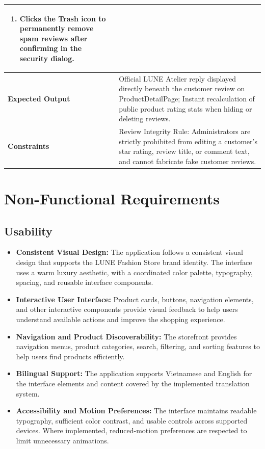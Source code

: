 \documentclass[12pt,a4paper,oneside]{report}
\begin{document}
\begin{longtable}{|p{3.6cm}|p{11.9cm}|}
\begin{enumerate}[leftmargin=*,nosep,topsep=2pt]
  \item Clicks the Trash icon to permanently remove spam reviews after confirming in the security dialog.
\end{enumerate} \\
\hline
\textbf{Expected Output} & Official LUNE Atelier reply displayed directly beneath the customer review on ProductDetailPage; Instant recalculation of public product rating stats when hiding or deleting reviews. \\
\hline
\textbf{Constraints} & Review Integrity Rule: Administrators are strictly prohibited from editing a customer's star rating, review title, or comment text, and cannot fabricate fake customer reviews. \\
\hline
\end{longtable}


\section{Non-Functional Requirements}

\subsection{Usability}
\begin{itemize}[leftmargin=1.2cm]
    \item \textbf{Consistent Visual Design:} The application follows a consistent visual design that supports the LUNE Fashion Store brand identity. The interface uses a warm luxury aesthetic, with a coordinated color palette, typography, spacing, and reusable interface components.
    \item \textbf{Interactive User Interface:} Product cards, buttons, navigation elements, and other interactive components provide visual feedback to help users understand available actions and improve the shopping experience.
    \item \textbf{Navigation and Product Discoverability:} The storefront provides navigation menus, product categories, search, filtering, and sorting features to help users find products efficiently.
    \item \textbf{Bilingual Support:} The application supports Vietnamese and English for the interface elements and content covered by the implemented translation system.
    \item \textbf{Accessibility and Motion Preferences:} The interface maintains readable typography, sufficient color contrast, and usable controls across supported devices. Where implemented, reduced-motion preferences are respected to limit unnecessary animations.
\end{itemize}
\end{document}
